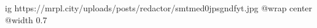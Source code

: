  
 
 
 
 

\ifcmt
  ig https://mrpl.city/uploads/posts/redactor/smtmed0jpsgndfyt.jpg
  @wrap center
  @width 0.7
\fi
